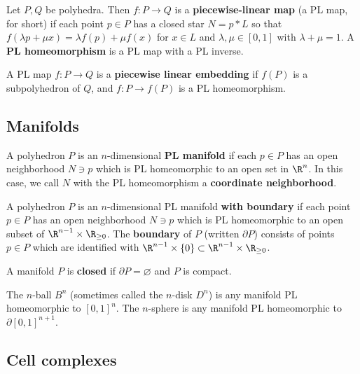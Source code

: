 \documentclass[12pt]{pset}
\newcommand{\join}{\ast}
\begin{document}
\begin{definition*}
  Let $P, Q$ be polyhedra. Then $f : P \to Q$ is a
  \textbf{piecewise-linear map} (a PL map, for short) if each point $p
  \in P$ has a closed star $N = p \join L$ so that $f(\lambda p + \mu
  x) = \lambda f(p) + \mu f(x)$ for $x \in L$ and $\lambda,\mu \in
  [0,1]$ with $\lambda + \mu = 1$.  A \textbf{PL homeomorphism} is a
  PL map with a PL inverse.
\end{definition*}

\begin{definition*}
  A PL map $f : P \to Q$ is a \textbf{piecewise linear embedding} if
  $f(P)$ is a subpolyhedron of $Q$, and $f : P \to f(P)$ is a PL
  homeomorphism.
\end{definition*}

\pagebreak
\subsection*{Manifolds}

\begin{definition*}
  A polyhedron $P$ is an $n$-dimensional \textbf{PL manifold} if each
  $p \in P$ has an open neighborhood $N \ni p$ which is PL
  homeomorphic to an open set in $\R^n$.  In this case, we call $N$
  with the PL homeomorphism a \textbf{coordinate neighborhood}.

  A polyhedron $P$ is an $n$-dimensional PL manifold \textbf{with
    boundary} if each point $p \in P$ has an open neighborhood $N \ni
  p$ which is PL homeomorphic to an open subset of $\R^{n-1} \times
  \R_{\geq 0}$.  The \textbf{boundary} of $P$ (written $\partial P$)
  consists of points $p \in P$ which are identified with $\R^{n-1}
  \times \{ 0 \} \subset \R^{n-1} \times \R_{\geq 0}$.

  A manifold $P$ is \textbf{closed} if $\partial P = \varnothing$ and
  $P$ is compact.
\end{definition*}

\begin{definition*}
  The $n$-ball $B^n$ (sometimes called the $n$-disk $D^n$) is any
  manifold PL homeomorphic to $[0,1]^n$.  The $n$-sphere is any
  manifold PL homeomorphic to $\partial [0,1]^{n+1}$.
\end{definition*}

\subsection*{Cell complexes}
\end{document}
